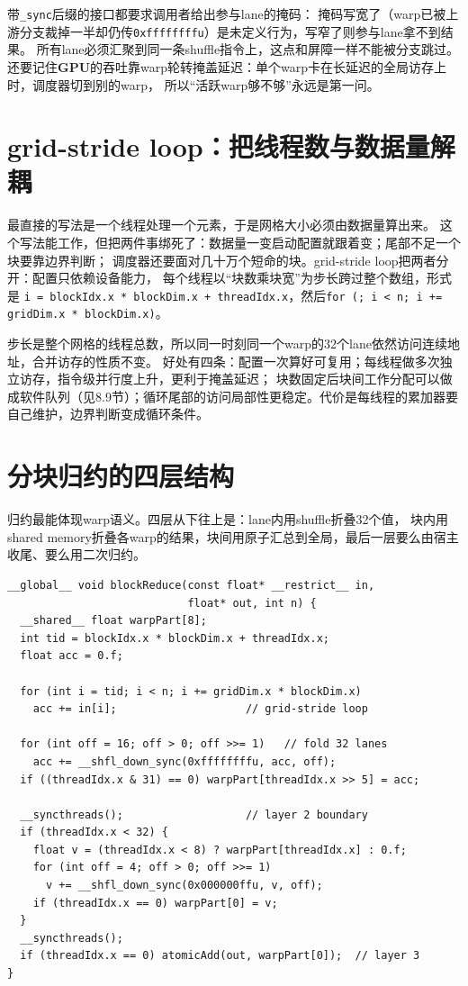 \documentclass[12pt,a4paper,fontset=fandol]{ctexbook}
\newcommand{\Tp}[1]{\texttt{#1}}
\newcommand{\Dom}[1]{\textsf{\bfseries #1}}
\newcommand{\GPU}{\Dom{GPU}}
\begin{document}
带\Tp{\_sync}后缀的接口都要求调用者给出参与lane的掩码：
掩码写宽了（warp已被上游分支裁掉一半却仍传\Tp{0xffffffffu}）是未定义行为，写窄了则参与lane拿不到结果。
所有lane必须汇聚到同一条shuffle指令上，这点和屏障一样不能被分支跳过。还要记住\GPU{}的吞吐靠warp轮转掩盖延迟：单个warp卡在长延迟的全局访存上时，调度器切到别的warp，
所以``活跃warp够不够''永远是第一问。

\section{grid-stride loop：把线程数与数据量解耦}

最直接的写法是一个线程处理一个元素，于是网格大小必须由数据量算出来。
这个写法能工作，但把两件事绑死了：数据量一变启动配置就跟着变；尾部不足一个块要靠边界判断；
调度器还要面对几十万个短命的块。grid-stride loop把两者分开：配置只依赖设备能力，
每个线程以``块数乘块宽''为步长跨过整个数组，形式是
\Tp{i = blockIdx.x * blockDim.x + threadIdx.x}，然后\Tp{for (; i < n; i += gridDim.x * blockDim.x)}。

步长是整个网格的线程总数，所以同一时刻同一个warp的32个lane依然访问连续地址，合并访存的性质不变。
好处有四条：配置一次算好可复用；每线程做多次独立访存，指令级并行度上升，更利于掩盖延迟；
块数固定后块间工作分配可以做成软件队列（见8.9节）；循环尾部的访问局部性更稳定。代价是每线程的累加器要自己维护，边界判断变成循环条件。

\section{分块归约的四层结构}

归约最能体现warp语义。四层从下往上是：lane内用shuffle折叠32个值，
块内用shared memory折叠各warp的结果，块间用原子汇总到全局，最后一层要么由宿主收尾、要么用二次归约。

\begin{lstlisting}[style=cudastyle,caption={分块归约核函数：四层结构的前三层}]
__global__ void blockReduce(const float* __restrict__ in,
                            float* out, int n) {
  __shared__ float warpPart[8];
  int tid = blockIdx.x * blockDim.x + threadIdx.x;
  float acc = 0.f;

  for (int i = tid; i < n; i += gridDim.x * blockDim.x)
    acc += in[i];                    // grid-stride loop

  for (int off = 16; off > 0; off >>= 1)   // fold 32 lanes
    acc += __shfl_down_sync(0xffffffffu, acc, off);
  if ((threadIdx.x & 31) == 0) warpPart[threadIdx.x >> 5] = acc;

  __syncthreads();                   // layer 2 boundary
  if (threadIdx.x < 32) {
    float v = (threadIdx.x < 8) ? warpPart[threadIdx.x] : 0.f;
    for (int off = 4; off > 0; off >>= 1)
      v += __shfl_down_sync(0x000000ffu, v, off);
    if (threadIdx.x == 0) warpPart[0] = v;
  }
  __syncthreads();
  if (threadIdx.x == 0) atomicAdd(out, warpPart[0]);  // layer 3
}
\end{lstlisting}
\end{document}
